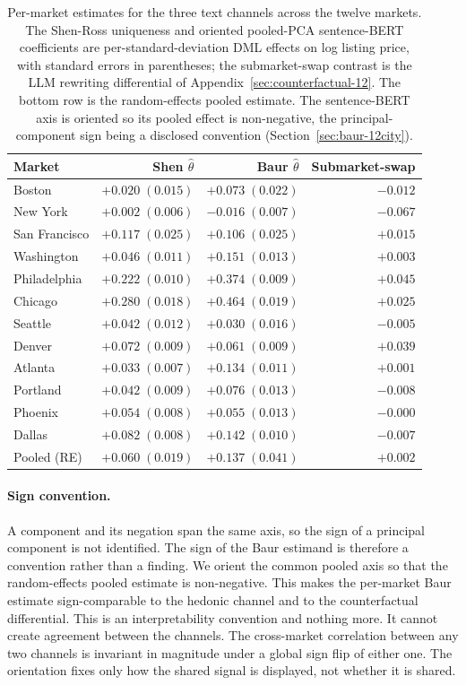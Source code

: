 \begin{table}[H]
\centering
\caption{Per-market estimates for the three text channels across the twelve
markets. The Shen-Ross uniqueness and oriented pooled-PCA sentence-BERT
coefficients are per-standard-deviation DML effects on log listing price, with
standard errors in parentheses; the submarket-swap contrast is the LLM rewriting
differential of Appendix~\ref{sec:counterfactual-12}. The bottom row is the
random-effects pooled estimate. The sentence-BERT axis is oriented so its pooled
effect is non-negative, the principal-component sign being a disclosed convention
(Section~\ref{sec:baur-12city}).}
\label{tab:cross-method-12}
\small
\begin{tabular}{lrrr}
\toprule
Market & Shen $\hat\theta$ & Baur $\hat\theta$ & Submarket-swap \\
\midrule
Boston        & $+0.020\;(0.015)$ & $+0.073\;(0.022)$ & $-0.012$ \\
New York      & $+0.002\;(0.006)$ & $-0.016\;(0.007)$ & $-0.067$ \\
San Francisco & $+0.117\;(0.025)$ & $+0.106\;(0.025)$ & $+0.015$ \\
Washington    & $+0.046\;(0.011)$ & $+0.151\;(0.013)$ & $+0.003$ \\
Philadelphia  & $+0.222\;(0.010)$ & $+0.374\;(0.009)$ & $+0.045$ \\
Chicago       & $+0.280\;(0.018)$ & $+0.464\;(0.019)$ & $+0.025$ \\
Seattle       & $+0.042\;(0.012)$ & $+0.030\;(0.016)$ & $-0.005$ \\
Denver        & $+0.072\;(0.009)$ & $+0.061\;(0.009)$ & $+0.039$ \\
Atlanta       & $+0.033\;(0.007)$ & $+0.134\;(0.011)$ & $+0.001$ \\
Portland      & $+0.042\;(0.009)$ & $+0.076\;(0.013)$ & $-0.008$ \\
Phoenix       & $+0.054\;(0.008)$ & $+0.055\;(0.013)$ & $-0.000$ \\
Dallas        & $+0.082\;(0.008)$ & $+0.142\;(0.010)$ & $-0.007$ \\
\midrule
Pooled (RE)   & $+0.060\;(0.019)$ & $+0.137\;(0.041)$ & $+0.002$ \\
\bottomrule
\end{tabular}
\end{table}

\paragraph{Sign convention.} A component and its negation span the same axis, so the sign of a principal component is not identified. The sign of the Baur estimand is therefore a convention rather than a finding. We orient the common pooled axis so that the random-effects pooled estimate is non-negative. This makes the per-market Baur estimate sign-comparable to the hedonic channel and to the counterfactual differential. This is an interpretability convention
and nothing more. It cannot create agreement between the channels. The cross-market correlation between any two channels is invariant in magnitude under a global sign flip of either one. The orientation fixes only how the
shared signal is displayed, not whether it is shared.

